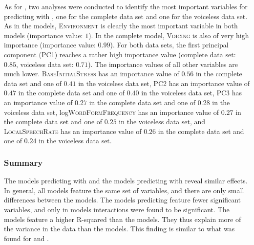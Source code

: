 As for , two  analyses were conducted to identify the most important variables for predicting  with , one for the complete data set and one for the voiceless data set. 
 As in the  models, \textsc{Environment} is clearly the most important variable in both models (importance value: $1$). In the complete model, \textsc{Voicing} is also of very high importance  (importance value: $0.99$). For both data sets, the first principal component (\textsc{PC1}) reaches a rather high importance value (complete data set: $0.85$,  voiceless data set: $0.71$). The importance values of all other variables are much lower.
\textsc{BaseInitialStress} has an importance value of $0.56$ in the complete data set and one of $0.41$ in the voiceless data set,   
\textsc{PC2} has an importance value of $0.47$ in the complete data set and one of $0.40$ in the voiceless data set,   
\textsc{PC3} has an importance value of $0.27$ in the complete data set and one of $0.28$ in the voiceless data set,   
log\textsc{WordFormFrequency} has an importance value of $0.27$ in the complete data set and one of $0.25$ in the voiceless data set, and  
\textsc{LocalSpeechRate} has an importance value of $0.26$ in the complete data set and one of $0.24$ in the voiceless data set.  

\subsubsection{Summary}


The models predicting  with  and the models predicting  with  reveal similar effects. In general, all models feature the same set of variables, and there are only small differences between the models. The models predicting  feature fewer significant variables, and only in  models interactions were found to be significant. 
The  models feature a higher R-squared than the  models. They thus explain more of the variance in the data than the  models. This finding is similar to what was found for  and . 

